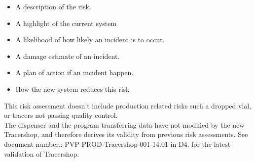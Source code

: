 \documentclass{article}
\begin{document}
\begin{itemize}
  \item A description of the risk.
  \item A highlight of the current system
  \item A likelihood of how likely an incident is to occur.
  \item A damage estimate of an incident.
  \item A plan of action if an incident happen.
  \item How the new system reduces this risk
\end{itemize}

This risk assessment doesn't include production related risks such a dropped
vial, or tracers not passing quality control.\\
The dispenser and the program transferring data have not modified by the new
Tracershop, and therefore derives its validity from previous risk assessments.
See document number.: PVP-PROD-Tracershop-001-14.01 in D4, for the latest
validation of Tracershop.
\end{document}
